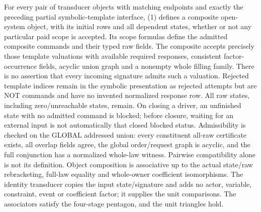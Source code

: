 \documentclass[11pt]{article}\usepackage{amsmath,amssymb,amsthm,geometry}\geometry{margin=1in}
\begin{document}
\begin{theorem}
For every pair of transducer objects with matching endpoints and exactly the preceding partial symbolic-template interface, (1) defines a composite open-system object, with its initial rows and all dependent states, whether or not any particular paid scope is accepted. Its scope formulas define the admitted composite commands and their typed raw fields. The composite accepts precisely those template valuations with available required responses, consistent factor-occurrence fields, acyclic union graph and a nonempty whole filling family. There is no assertion that every incoming signature admits such a valuation. Rejected template indices remain in the symbolic presentation as rejected attempts but are NOT commands and have no invented normalized response row. All raw states, including zero/unreachable states, remain. On closing a driver, an unfinished state with no admitted command is blocked; before closure, waiting for an external input is not automatically that closed blocked status. Admissibility is checked on the GLOBAL addressed union: every constituent all-raw certificate exists, all overlap fields agree, the global order/request graph is acyclic, and the full conjunction has a normalized whole-law witness. Pairwise compatibility alone is not its definition. Object composition is associative up to the actual state/raw rebracketing, full-law equality and whole-owner coefficient isomorphisms. The identity transducer copies the input state/signature and adds no actor, variable, constraint, event or coefficient factor; it supplies the unit comparisons. The associators satisfy the four-stage pentagon, and the unit triangles hold.
\end{theorem}
\end{document}
